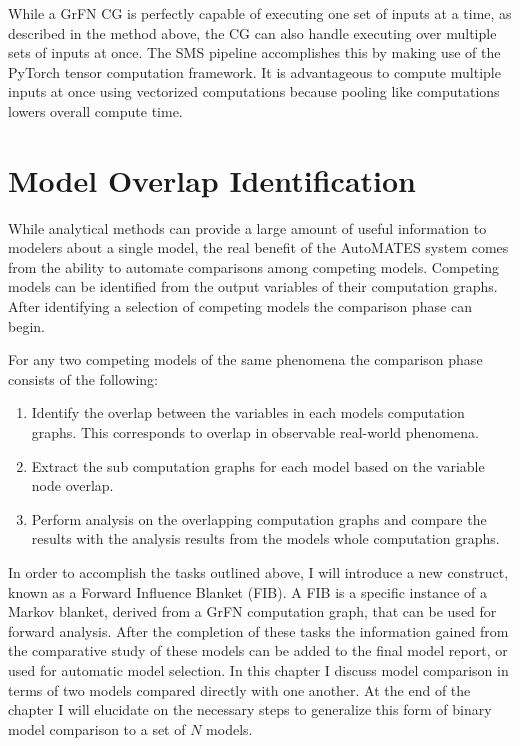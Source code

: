 While a GrFN CG is perfectly capable of executing one set of inputs at a time, as described in the method above, the CG can also handle executing over multiple sets of inputs at once.
The SMS pipeline accomplishes this by making use of the PyTorch tensor computation framework.
It is advantageous to compute multiple inputs at once using vectorized computations because pooling like computations lowers overall compute time.

\section{Model Overlap Identification\label{sec:overlap_identification}}

While analytical methods can provide a large amount of useful information to modelers about a single model, the real benefit of the AutoMATES system comes from the ability to automate comparisons among competing models. Competing models can be identified from the output variables of their computation graphs. After identifying a selection of competing models the comparison phase can begin.

For any two competing models of the same phenomena the comparison phase consists of the following:

\begin{enumerate}
  \item Identify the overlap between the variables in each models computation graphs. This corresponds to overlap in observable real-world phenomena.
  \item Extract the sub computation graphs for each model based on the variable node overlap.
  \item Perform analysis on the overlapping computation graphs and compare the results with the analysis results from the models whole computation graphs.
\end{enumerate}

In order to accomplish the tasks outlined above, I will introduce a new construct, known as a Forward Influence Blanket (FIB). A FIB is a specific instance of a Markov blanket, derived from a GrFN computation graph, that can be used for forward analysis.  %
After the completion of these tasks the information gained from the comparative study of these models can be added to the final model report, or used for automatic model selection. In this chapter I discuss model comparison in terms of two models compared directly with one another. At the end of the chapter I will elucidate on the necessary steps to generalize this form of binary model comparison to a set of $N$ models.

